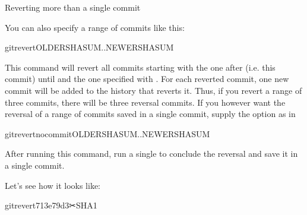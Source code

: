 \ignorespaces \begin{findoutmore}[label={fom-revert}, before title={\thetcbcounter\ }, float, floatplacement=tbp, check odd page=true]{Reverting more than a single commit}
\label{\detokenize{basics/101-137-history:fom-revert}}

\sphinxAtStartPar
You can also specify a range of commits like this:

\begin{sphinxVerbatim}[commandchars=\\\{\}]
gitrevertOLDER\PYGZus{}SHASUM..NEWERSHASUM
\end{sphinxVerbatim}

\sphinxAtStartPar
This command will revert all commits starting with the one after
 (i.e.  this commit) until and 
the one specified with .
For each reverted commit, one new commit will be added to the history that
reverts it. Thus, if you revert a range of three commits, there will be three
reversal commits. If you however want the reversal of a range of commits
saved in a single commit, supply the  option as in

\begin{sphinxVerbatim}[commandchars=\\\{\}]
gitrevert\PYGZhy{}\PYGZhy{}no\PYGZhy{}commitOLDER\PYGZus{}SHASUM..NEWERSHASUM
\end{sphinxVerbatim}

\sphinxAtStartPar
After running this command, run a single  to conclude the
reversal and save it in a single commit.


\end{findoutmore}

\sphinxAtStartPar
Let’s see how it looks like:

\begin{sphinxVerbatim}[commandchars=\\\{\}]
gitrevert713e79d3✂SHA1
\end{sphinxVerbatim}

